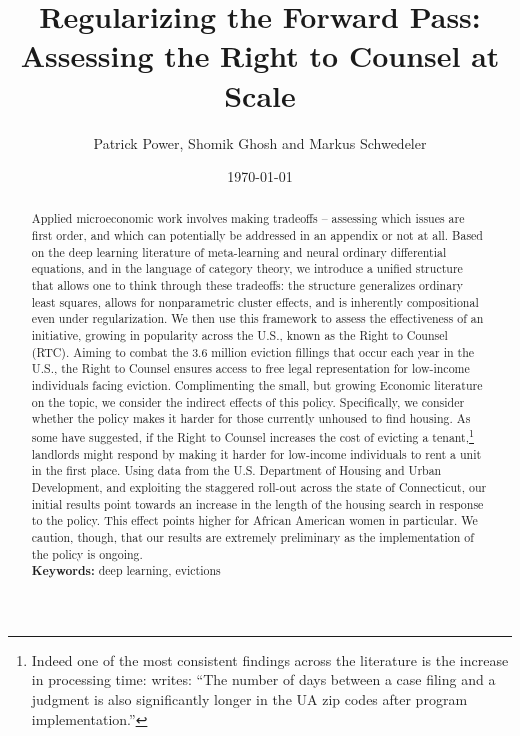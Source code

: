 \documentclass[a4paper,12pt]{article}
\begin{document}
\begin{titlepage}
\title{Regularizing the Forward Pass: Assessing the Right to Counsel at Scale}

\author{Patrick Power, Shomik Ghosh and Markus Schwedeler}
\date{\today}
\maketitle
\thispagestyle{empty} %
\vspace{-2em}
\begin{abstract}
 Applied microeconomic work involves making tradeoffs -- assessing which issues are first order, and which can potentially be addressed in an appendix or not at all. Based on the deep learning literature of meta-learning and neural ordinary differential equations, and in the language of category theory, we introduce a unified structure that allows one to think through these tradeoffs: the structure generalizes ordinary least squares, allows for nonparametric cluster effects, and is inherently compositional even under regularization. We then use this framework to assess the effectiveness of an initiative,  growing in popularity across the U.S., known as the Right to Counsel (RTC). Aiming to combat the 3.6 million eviction fillings that occur each year in the U.S., the Right to Counsel ensures access to free legal representation for low-income individuals facing eviction. Complimenting the small, but growing Economic literature on the topic, we consider the indirect effects of this policy. Specifically, we consider whether the policy makes it harder for those currently unhoused to find housing. As some have suggested, if the Right to Counsel increases the cost of evicting a tenant,\footnote{Indeed one of the most consistent findings across the literature is the increase in processing time: \cite{cassidy2022effects} writes: ``The number of days between a case filing and a judgment is also significantly longer in the UA zip codes after program implementation.''} landlords might respond by making it harder for low-income individuals to rent a unit in the first place. Using data from the U.S. Department of Housing and Urban Development, and exploiting the staggered roll-out across the state of Connecticut, our initial results point towards an increase in the length of the housing search in response to the policy. This effect points higher for African American women in particular. We caution, though, that our results are extremely preliminary as the implementation of the policy is ongoing.
\vspace{0.2in}\\
\noindent\textbf{Keywords:} deep learning, evictions\\
\end{abstract}
\setcounter{page}{1}
\end{titlepage}
\end{document}

